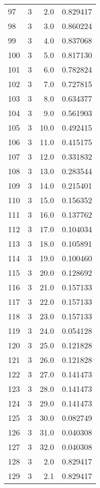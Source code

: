 \begin{tabular}{lrrr}
97  &        3 &      2.0 &  0.829417 \\
98  &        3 &      3.0 &  0.860224 \\
99  &        3 &      4.0 &  0.837068 \\
100 &        3 &      5.0 &  0.817130 \\
101 &        3 &      6.0 &  0.782824 \\
102 &        3 &      7.0 &  0.727815 \\
103 &        3 &      8.0 &  0.634377 \\
104 &        3 &      9.0 &  0.561903 \\
105 &        3 &     10.0 &  0.492415 \\
106 &        3 &     11.0 &  0.415175 \\
107 &        3 &     12.0 &  0.331832 \\
108 &        3 &     13.0 &  0.283544 \\
109 &        3 &     14.0 &  0.215401 \\
110 &        3 &     15.0 &  0.156352 \\
111 &        3 &     16.0 &  0.137762 \\
112 &        3 &     17.0 &  0.104034 \\
113 &        3 &     18.0 &  0.105891 \\
114 &        3 &     19.0 &  0.100460 \\
115 &        3 &     20.0 &  0.128692 \\
116 &        3 &     21.0 &  0.157133 \\
117 &        3 &     22.0 &  0.157133 \\
118 &        3 &     23.0 &  0.157133 \\
119 &        3 &     24.0 &  0.054128 \\
120 &        3 &     25.0 &  0.121828 \\
121 &        3 &     26.0 &  0.121828 \\
122 &        3 &     27.0 &  0.141473 \\
123 &        3 &     28.0 &  0.141473 \\
124 &        3 &     29.0 &  0.141473 \\
125 &        3 &     30.0 &  0.082749 \\
126 &        3 &     31.0 &  0.040308 \\
127 &        3 &     32.0 &  0.040308 \\
128 &        3 &      2.0 &  0.829417 \\
129 &        3 &      2.1 &  0.829417 \\

\end{tabular}

